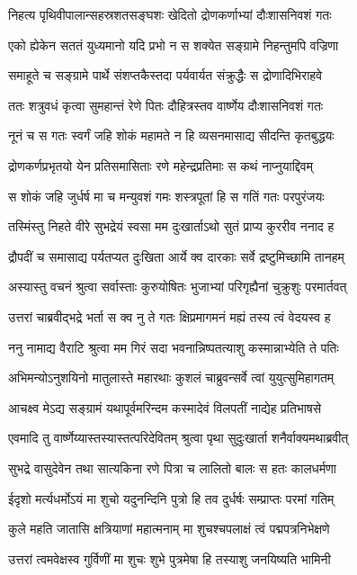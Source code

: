 \twolineshloka
{निहत्य पृथिवीपालान्सहस्रशतसङ्घशः}
{खेदितो द्रोणकर्णाभ्यां दौःशासनिवशं गतः}


\twolineshloka
{एको ह्येकेन सततं युध्यमानो यदि प्रभो}
{न स शक्येत सङ्ग्रामे निहन्तुमपि वज्रिणा}


\twolineshloka
{समाहूते च सङ्ग्रामे पार्थे संशप्तकैस्तदा}
{पर्यवार्यत संक्रुद्धैः स द्रोणादिभिराहवे}


\twolineshloka
{ततः शत्रुवधं कृत्वा सुमहान्तं रेणे पितः}
{दौहित्रस्तव वार्ष्णेय दौःशासनिवशं गतः}


\twolineshloka
{नूनं च स गतः स्वर्गं जहि शोकं महामते}
{न हि व्यसनमासाद्य सीदन्ति कृतबुद्धयः}


\twolineshloka
{द्रोणकर्णप्रभृतयो येन प्रतिसमासिताः}
{रणे महेन्द्रप्रतिमाः स कथं नाप्नुयाद्दिवम्}


\twolineshloka
{स शोकं जहि जुर्धर्ष मा च मन्युवशं गमः}
{शस्त्रपूतां हि स गतिं गतः परपुरंजयः}


\twolineshloka
{तस्मिंस्तु निहते वीरे सुभद्रेयं स्वसा मम}
{दुःखार्ताऽथो सुतं प्राप्य कुररीव ननाद ह}


\twolineshloka
{द्रौपदीं च समासाद्य पर्यतप्यत दुःखिता}
{आर्ये क्व दारकाः सर्वे द्रष्टुमिच्छामि तानहम्}


\twolineshloka
{अस्यास्तु वचनं श्रुत्वा सर्वास्ताः कुरुयोषितः}
{भुजाभ्यां परिगृह्यैनां चुक्रुशुः परमार्तवत्}


\twolineshloka
{उत्तरां चाब्रवीद्भद्रे भर्ता स क्व नु ते गतः}
{क्षिप्रमागमनं मह्यं तस्य त्वं वेदयस्व ह}


\twolineshloka
{ननु नामाद्य वैराटि श्रुत्वा मम गिरं सदा}
{भवनान्निष्पतत्याशु कस्मान्नाभ्येति ते पतिः}


\twolineshloka
{अभिमन्योऽनुशयिनो मातुलास्ते महारथाः}
{कुशलं चाब्रुवन्सर्वे त्वां युयुत्सुमिहागतम्}


\threelineshloka
{आचक्ष्व मेऽद्य सङ्ग्रामं यथापूर्वमरिन्दम}
{कस्मादेवं विलपतीं नाद्येह प्रतिभाषसे}
{}


\twolineshloka
{एवमादि तु वार्ष्णेय्यास्तस्यास्तत्परिदेवितम्}
{श्रुत्वा पृथा सुदुःखार्ता शनैर्वाक्यमथाब्रवीत्}


\twolineshloka
{सुभद्रे वासुदेवेन तथा सात्यकिना रणे}
{पित्रा च लालितो बालः स हतः कालधर्मणा}


\twolineshloka
{ईदृशो मर्त्यधर्मोऽयं मा शुचो यदुनन्दिनि}
{पुत्रो हि तव दुर्धर्षः सम्प्राप्तः परमां गतिम्}


\twolineshloka
{कुले महति जातासि क्षत्रियाणां महात्मनाम्}
{मा शुचश्चपलाक्षं त्वं पद्मपत्रनिभेक्षणे}


\twolineshloka
{उत्तरां त्वमवेक्षस्व गुर्विणीं मा शुचः शुभे}
{पुत्रमेषा हि तस्याशु जनयिष्यति भामिनी}


